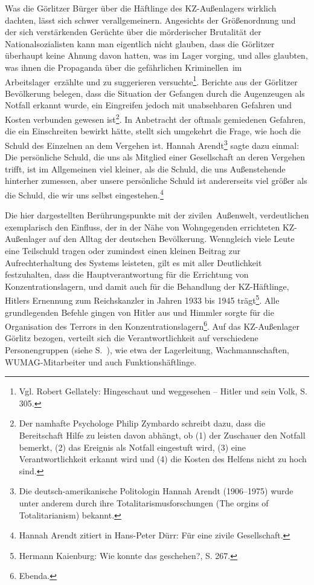 Was die Görlitzer Bürger über die Häftlinge des KZ-Außenlagers wirklich dachten, lässt sich schwer verallgemeinern.
Angesichts der Größenordnung und der sich verstärkenden Gerüchte über die mörderischer Brutalität der Nationalsozialisten kann man eigentlich nicht glauben, dass die Görlitzer überhaupt keine Ahnung davon hatten, was im Lager vorging, und alles glaubten, was ihnen die Propaganda über die \glqq gefährlichen Kriminellen\grqq~im \glqq Arbeitslager\grqq~erzählte und zu suggerieren versuchte\footnote{Vgl. Robert Gellately: Hingeschaut und weggesehen -- Hitler und sein Volk, S. 305.}. Berichte aus der Görlitzer Bevölkerung belegen, dass die Situation der Gefangen durch die Augenzeugen als Notfall erkannt wurde, ein Eingreifen jedoch mit unabsehbaren Gefahren und Kosten verbunden gewesen ist\footnote{Der namhafte Psychologe Philip Zymbardo schreibt dazu, dass die Bereitschaft Hilfe zu leisten davon abhängt, ob (1) der Zuschauer den Notfall bemerkt, (2) das Ereignis als Notfall eingestuft wird, (3) eine Verantwortlichkeit erkannt wird und (4) die Kosten des Helfens nicht zu hoch sind.}.
In Anbetracht der oftmals gemiedenen Gefahren, die ein Einschreiten bewirkt hätte, stellt sich umgekehrt die Frage, wie hoch die Schuld des Einzelnen an dem Vergehen ist. Hannah Arendt\footnote{Die deutsch-amerikanische Politologin Hannah Arendt (1906--1975) wurde unter anderem durch ihre Totalitarismusforschungen (\glqq The orgins of Totalitarianism\grqq) bekannt.} sagte dazu einmal:
 \glqq Die persönliche Schuld, die uns als Mitglied einer Gesellschaft an deren Vergehen trifft, ist im Allgemeinen viel kleiner, als die Schuld, die uns Außenstehende hinterher zumessen, aber unsere persönliche Schuld ist andererseits viel größer als die Schuld, die wir uns selbst eingestehen.\grqq\footnote{Hannah Arendt zitiert in Hans-Peter Dürr: \glqq Für eine zivile Gesellschaft\grqq.}

Die hier dargestellten Berührungspunkte mit der \glqq zivilen\grqq~Außenwelt, verdeutlichen exemplarisch den Einfluss, der in der Nähe von Wohngegenden errichteten KZ-Außenlager auf den Alltag der deutschen Bevölkerung.
Wenngleich viele Leute eine Teilschuld tragen oder zumindest einen kleinen Beitrag zur Aufrechterhaltung des Systems leisteten, gilt es mit aller Deutlichkeit festzuhalten, dass die Hauptverantwortung für die Errichtung von Konzentrationslagern, und damit auch für die Behandlung der KZ-Häftlinge, Hitlers Ernennung zum Reichskanzler in Jahren 1933 bis 1945 trägt\footnote{Hermann Kaienburg: Wie konnte das geschehen?, S. 267.}. Alle grundlegenden Befehle gingen von Hitler aus und Himmler sorgte für die Organisation des Terrors in den Konzentrationslagern\footnote{Ebenda.}. Auf das KZ-Außenlager Görlitz bezogen, verteilt sich die Verantwortlichkeit auf verschiedene Personengruppen (siehe S.~\pageref{ns-verbrechen}), wie etwa der Lagerleitung, Wachmannschaften, WUMAG-Mitarbeiter und auch Funktionshäftlinge.

